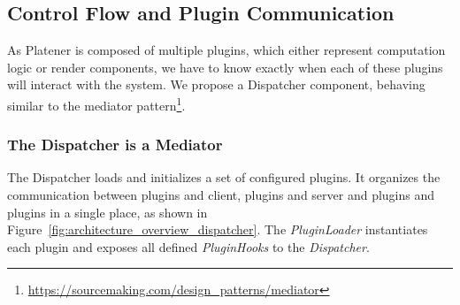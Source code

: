\documentclass[../ClassicThesis.tex]{subfiles}
\begin{document}



\subsection{Control Flow and Plugin Communication}

As Platener is composed of multiple plugins, which either represent computation
logic or render components, we have to know exactly when each of these plugins
will interact with the system. We propose a Dispatcher component, behaving
similar to the mediator
pattern\footnote{\url{https://sourcemaking.com/design_patterns/mediator}}.

\subsubsection{The Dispatcher is a Mediator}

The Dispatcher loads and initializes a set of configured plugins. It organizes
the communication between plugins and client, plugins and server and plugins and
plugins in a single place, as shown in
Figure~\ref{fig:architecture_overview_dispatcher}. The \emph{PluginLoader}
instantiates each plugin and exposes all defined \emph{PluginHooks} to the
\emph{Dispatcher}. 

\end{document}
